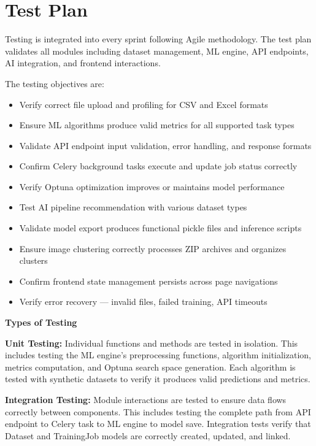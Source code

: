 \documentclass[12pt,a4paper]{report}
\begin{document}
\section{Test Plan}

Testing is integrated into every sprint following Agile methodology. The test plan validates all modules including dataset management, ML engine, API endpoints, AI integration, and frontend interactions.

The testing objectives are:
\begin{itemize}
    \item Verify correct file upload and profiling for CSV and Excel formats
    \item Ensure ML algorithms produce valid metrics for all supported task types
    \item Validate API endpoint input validation, error handling, and response formats
    \item Confirm Celery background tasks execute and update job status correctly
    \item Verify Optuna optimization improves or maintains model performance
    \item Test AI pipeline recommendation with various dataset types
    \item Validate model export produces functional pickle files and inference scripts
    \item Ensure image clustering correctly processes ZIP archives and organizes clusters
    \item Confirm frontend state management persists across page navigations
    \item Verify error recovery — invalid files, failed training, API timeouts
\end{itemize}

\textbf{Types of Testing}

\textbf{Unit Testing:}
Individual functions and methods are tested in isolation. This includes testing the ML engine's preprocessing functions, algorithm initialization, metrics computation, and Optuna search space generation. Each algorithm is tested with synthetic datasets to verify it produces valid predictions and metrics.

\vspace{0.3cm}

\textbf{Integration Testing:}
Module interactions are tested to ensure data flows correctly between components. This includes testing the complete path from API endpoint to Celery task to ML engine to model save. Integration tests verify that Dataset and TrainingJob models are correctly created, updated, and linked.
\end{document}
